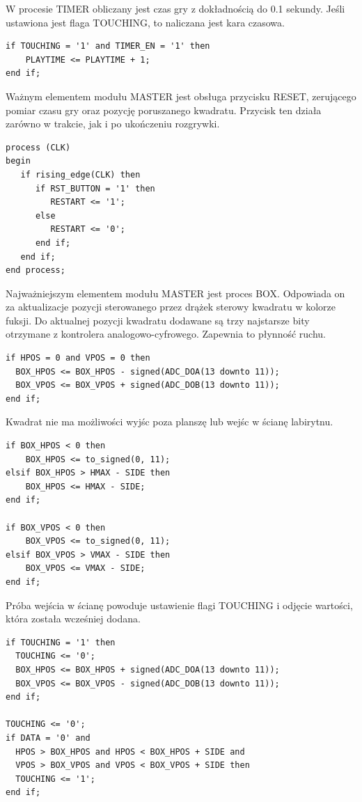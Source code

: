 \documentclass[11pt]{article}
\begin{document}
W procesie TIMER obliczany jest czas gry z dokładnością do 0.1 sekundy. 
Jeśli ustawiona jest flaga TOUCHING, to naliczana jest kara czasowa.

\begin{lstlisting}
if TOUCHING = '1' and TIMER_EN = '1' then
    PLAYTIME <= PLAYTIME + 1;
end if;
\end{lstlisting}

Ważnym elementem modułu MASTER jest obsługa przycisku RESET, zerującego pomiar czasu gry oraz pozycję poruszanego kwadratu. 
Przycisk ten działa zarówno w trakcie, jak i po ukończeniu rozgrywki. 

\begin{lstlisting}
process (CLK)
begin
   if rising_edge(CLK) then
      if RST_BUTTON = '1' then
         RESTART <= '1';
      else
         RESTART <= '0';
      end if;
   end if;
end process;
\end{lstlisting}

Najważniejszym elementem modułu MASTER jest proces BOX. 
Odpowiada on za aktualizacje pozycji sterowanego przez drążek sterowy kwadratu w kolorze fuksji.
Do aktualnej pozycji kwadratu dodawane są trzy najstarsze bity otrzymane z kontrolera analogowo-cyfrowego.
Zapewnia to płynność ruchu.

\begin{lstlisting}
if HPOS = 0 and VPOS = 0 then
  BOX_HPOS <= BOX_HPOS - signed(ADC_DOA(13 downto 11));
  BOX_VPOS <= BOX_VPOS + signed(ADC_DOB(13 downto 11));
end if;
\end{lstlisting}


Kwadrat nie ma możliwości wyjśc poza planszę lub wejśc w ścianę labirytnu.

\begin{lstlisting}
if BOX_HPOS < 0 then
    BOX_HPOS <= to_signed(0, 11);
elsif BOX_HPOS > HMAX - SIDE then
    BOX_HPOS <= HMAX - SIDE;
end if;

if BOX_VPOS < 0 then
    BOX_VPOS <= to_signed(0, 11);
elsif BOX_VPOS > VMAX - SIDE then
    BOX_VPOS <= VMAX - SIDE;
end if;
\end{lstlisting}

Próba wejścia w ścianę powoduje ustawienie flagi TOUCHING i odjęcie wartości, która została wcześniej dodana.

\begin{lstlisting}
if TOUCHING = '1' then
  TOUCHING <= '0';
  BOX_HPOS <= BOX_HPOS + signed(ADC_DOA(13 downto 11));
  BOX_VPOS <= BOX_VPOS - signed(ADC_DOB(13 downto 11));
end if;

TOUCHING <= '0';
if DATA = '0' and
  HPOS > BOX_HPOS and HPOS < BOX_HPOS + SIDE and 
  VPOS > BOX_VPOS and VPOS < BOX_VPOS + SIDE then
  TOUCHING <= '1';
end if;
\end{lstlisting}
\end{document}
